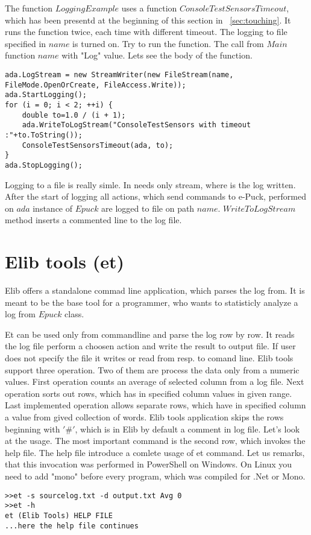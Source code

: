 	The function $LoggingExample$ uses a function $ConsoleTestSensorsTimeout$, which has been presentd at the beginning of this section in ~\ref{sec:touching}.
	It runs the function twice, each time with different timeout. The logging to file specified in $name$ is turned on.
	Try to run the function. The call from $Main$ function $name$ with "Log" value.
	Lets see the body of the function.
\begin{lstlisting}
ada.LogStream = new StreamWriter(new FileStream(name, FileMode.OpenOrCreate, FileAccess.Write));
ada.StartLogging();
for (i = 0; i < 2; ++i) {
	double to=1.0 / (i + 1);
	ada.WriteToLogStream("ConsoleTestSensors with timeout :"+to.ToString());
	ConsoleTestSensorsTimeout(ada, to);
}
ada.StopLogging();
\end{lstlisting}
	Logging to a file is really simle. In needs only stream, where is the log written. 
	After the start of logging all actions, which send commands to e-Puck, performed on $ada$ instance of $Epuck$ are logged
	to file on path $name$.
	$WriteToLogStream$ method inserts a commented line to the log file.

\section{Elib tools (et)}\label{sec:et}
	Elib offers a standalone commad line application, which
	parses the log from. It is meant to be the base tool for a programmer,
	who wants to statisticly analyze a log from $Epuck$ class.

	Et can be used only from commandline and parse the log row by row.
	It reads the log file perform a choosen action and write the result to output file.
	If user does not specify the file it writes or read from resp. to comand line.
	Elib tools support three operation. Two of them are process the data only from a numeric values.
	First operation counts an average of selected column from a log file.
	Next operation sorts out rows, which has in specified column values in given range.
	Last implemented operation allows separate rows, which have in specified column a value from gived collection of words.
	Elib tools application skips the rows beginning with $'\#'$, which is in Elib by default a comment in log file.
	Let's look at the usage. The most important command is the second row, which invokes the help file.
	The help file introduce a comlete usage of et command.
	Let us remarks, that this invocation was performed in PowerShell on Windows. On Linux you need to add "mono" before every program,
	which was compiled for .Net or Mono.
\begin{verbatim}
>>et -s sourcelog.txt -d output.txt Avg 0
>>et -h
et (Elib Tools) HELP FILE
...here the help file continues
\end{verbatim}

